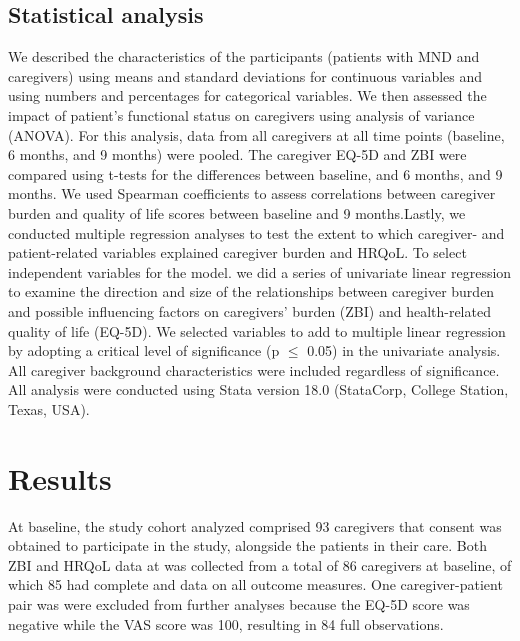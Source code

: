 \documentclass[12pt]{article}
\begin{document}
\subsection*{Statistical analysis}
We described the characteristics of the participants (patients with MND and caregivers) using means and standard deviations for continuous variables and using numbers and percentages for categorical variables. We then assessed the impact of patient’s functional status on caregivers using analysis of variance (ANOVA). For this analysis, data from all caregivers at all time points (baseline, 6 months, and 9 months) were pooled. The caregiver EQ-5D and ZBI were compared using t-tests for the differences between baseline, and 6 months, and 9 months. We used Spearman coefficients to assess correlations between caregiver burden and quality of life scores between baseline and 9 months.Lastly, we conducted multiple regression analyses to test the extent to which caregiver- and patient-related variables explained caregiver burden and HRQoL.
To select independent variables for the model. we did a series of univariate linear regression to examine the direction and size of the relationships between caregiver burden and possible influencing factors on  caregivers’ burden (ZBI) and health-related quality of life (EQ-5D). We selected variables to add to multiple linear regression by adopting a critical level of significance (p $\leq$ 0.05) in the univariate analysis. All caregiver background characteristics were included regardless of significance.
All analysis were conducted using Stata version 18.0 (StataCorp, College Station, Texas, USA).

\section*{Results} %
At baseline, the study cohort analyzed comprised 93 caregivers that consent was obtained to participate in the study, alongside the patients in their care. Both ZBI and HRQoL data at was collected from a total of 86 caregivers at baseline, of which 85 had complete and data on all outcome measures. One caregiver-patient pair was were excluded from further analyses because the EQ-5D score was negative while the VAS score was 100, resulting in 84 full observations. %
\end{document}
